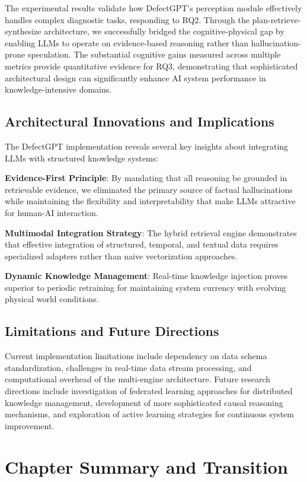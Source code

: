 The experimental results validate how DefectGPT's perception module effectively handles complex diagnostic tasks, responding to RQ2. Through the plan-retrieve-synthesize architecture, we successfully bridged the cognitive-physical gap by enabling LLMs to operate on evidence-based reasoning rather than hallucination-prone speculation. The substantial cognitive gains measured across multiple metrics provide quantitative evidence for RQ3, demonstrating that sophisticated architectural design can significantly enhance AI system performance in knowledge-intensive domains.

\subsection{Architectural Innovations and Implications}

The DefectGPT implementation reveals several key insights about integrating LLMs with structured knowledge systems:

\textbf{Evidence-First Principle}: By mandating that all reasoning be grounded in retrievable evidence, we eliminated the primary source of factual hallucinations while maintaining the flexibility and interpretability that make LLMs attractive for human-AI interaction.

\textbf{Multimodal Integration Strategy}: The hybrid retrieval engine demonstrates that effective integration of structured, temporal, and textual data requires specialized adapters rather than naive vectorization approaches.

\textbf{Dynamic Knowledge Management}: Real-time knowledge injection proves superior to periodic retraining for maintaining system currency with evolving physical world conditions.

\subsection{Limitations and Future Directions}

Current implementation limitations include dependency on data schema standardization, challenges in real-time data stream processing, and computational overhead of the multi-engine architecture. Future research directions include investigation of federated learning approaches for distributed knowledge management, development of more sophisticated causal reasoning mechanisms, and exploration of active learning strategies for continuous system improvement.

\section{Chapter Summary and Transition}

